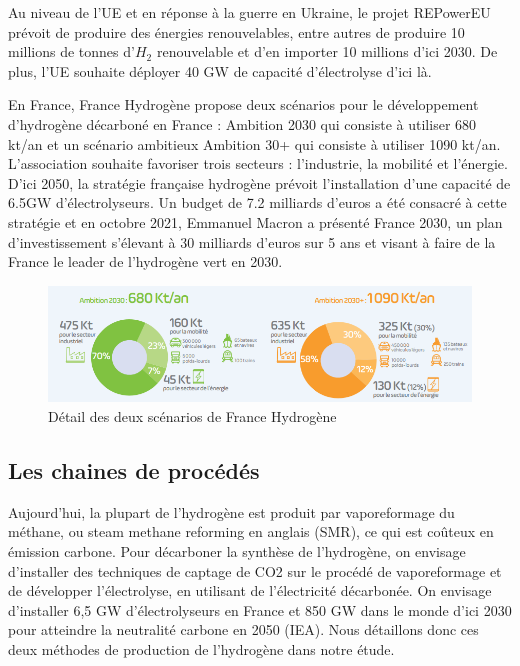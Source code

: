 \documentclass[11pt,french,a4paper]{article}
\begin{document}
Au niveau de l’UE et en réponse à la guerre en Ukraine, le projet REPowerEU prévoit de produire des énergies renouvelables, entre autres de produire 10 millions de tonnes d’$H_2$ renouvelable et d’en importer 10 millions d’ici 2030. De plus, l’UE souhaite déployer 40 GW de capacité d’électrolyse d’ici là. 

En France, France Hydrogène propose deux scénarios pour le développement d’hydrogène décarboné en France : Ambition 2030 qui consiste à utiliser 680 kt/an et un scénario ambitieux Ambition 30+ qui consiste à utiliser 1090 kt/an. L'association souhaite favoriser trois secteurs : l’industrie, la mobilité et l’énergie. D’ici 2050, la stratégie française hydrogène prévoit l’installation d’une capacité de 6.5GW d’électrolyseurs. Un budget de 7.2 milliards d'euros a été consacré à cette stratégie et en octobre 2021, Emmanuel Macron a présenté France 2030, un plan d’investissement s’élevant à 30 milliards d’euros sur 5 ans et visant à faire de la France le leader de l’hydrogène vert en 2030. \\

\begin{figure}[h]
\centering
\includegraphics[width=.9\linewidth]{image/chap1/ambitions_scenarios.PNG}
\caption{Détail des deux scénarios de France Hydrogène \cite{hydrogene_2021}}
\end{figure}

\subsection{Les chaines de procédés}

Aujourd’hui, la plupart de l’hydrogène est produit par vaporeformage du méthane, ou steam methane reforming en anglais (SMR), ce qui est coûteux en émission carbone. Pour décarboner la synthèse de l’hydrogène, on envisage d’installer des techniques de captage de CO2 sur le procédé de vaporeformage et de développer l’électrolyse, en utilisant de l’électricité décarbonée. On envisage d’installer 6,5 GW d’électrolyseurs en France et 850 GW dans le monde d’ici 2030 pour atteindre la neutralité carbone en 2050 (IEA). 
Nous détaillons donc ces deux méthodes de production de l’hydrogène dans notre étude. 
\end{document}
